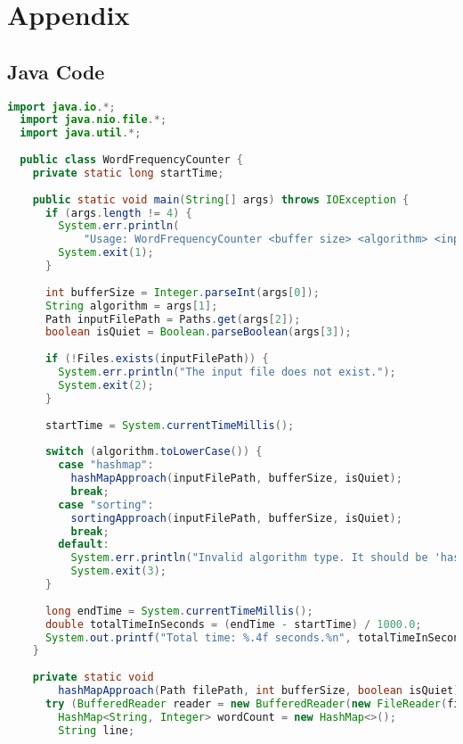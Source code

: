 \documentclass{article}
\begin{document}
\clearpage
\appendix
\section*{Appendix}
\subsection*{Java Code}
\begin{lstlisting}[language=Java, 
  basicstyle=\ttfamily\scriptsize, 
  numbers=none, 
  frame=single,
  showspaces=false,
  caption={Source Code for the WordFrequencyCounter.java file.}]
  import java.io.*;
  import java.nio.file.*;
  import java.util.*;
  
  public class WordFrequencyCounter {
    private static long startTime;
  
    public static void main(String[] args) throws IOException {
      if (args.length != 4) {
        System.err.println(
            "Usage: WordFrequencyCounter <buffer size> <algorithm> <input file> <quiet flag>");
        System.exit(1);
      }
  
      int bufferSize = Integer.parseInt(args[0]);
      String algorithm = args[1];
      Path inputFilePath = Paths.get(args[2]);
      boolean isQuiet = Boolean.parseBoolean(args[3]);
  
      if (!Files.exists(inputFilePath)) {
        System.err.println("The input file does not exist.");
        System.exit(2);
      }
  
      startTime = System.currentTimeMillis();
  
      switch (algorithm.toLowerCase()) {
        case "hashmap":
          hashMapApproach(inputFilePath, bufferSize, isQuiet);
          break;
        case "sorting":
          sortingApproach(inputFilePath, bufferSize, isQuiet);
          break;
        default:
          System.err.println("Invalid algorithm type. It should be 'hashmap' or 'sorting'.");
          System.exit(3);
      }
  
      long endTime = System.currentTimeMillis();
      double totalTimeInSeconds = (endTime - startTime) / 1000.0;
      System.out.printf("Total time: %.4f seconds.%n", totalTimeInSeconds);
    }
  
    private static void
        hashMapApproach(Path filePath, int bufferSize, boolean isQuiet) throws IOException {
      try (BufferedReader reader = new BufferedReader(new FileReader(filePath.toFile()), bufferSize)) {
        HashMap<String, Integer> wordCount = new HashMap<>();
        String line;
  

\end{lstlisting}
\end{document}
